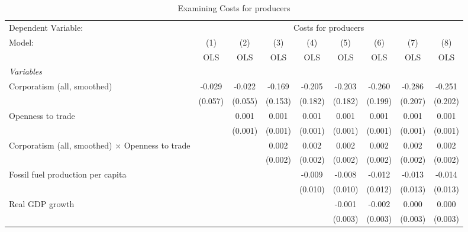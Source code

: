 
\begin{table}[htbp]
   \caption{Examining Costs for producers}
   \centering
   \begin{tabular}{lcccccccc}
      \toprule
      Dependent Variable: & \multicolumn{8}{c}{Costs for producers}\\
      Model:                                                  & (1)     & (2)     & (3)     & (4)     & (5)     & (6)     & (7)     & (8)\\  
                                                              &  OLS    & OLS     & OLS     & OLS     & OLS     & OLS     & OLS     & OLS\\  
      \midrule
      \emph{Variables}\\
      Corporatism (all, smoothed)                             & -0.029  & -0.022  & -0.169  & -0.205  & -0.203  & -0.260  & -0.286  & -0.251\\   
                                                              & (0.057) & (0.055) & (0.153) & (0.182) & (0.182) & (0.199) & (0.207) & (0.202)\\   
      Openness to trade                                       &         & 0.001   & 0.001   & 0.001   & 0.001   & 0.001   & 0.001   & 0.001\\   
                                                              &         & (0.001) & (0.001) & (0.001) & (0.001) & (0.001) & (0.001) & (0.001)\\   
      Corporatism (all, smoothed) $\times$ Openness to trade  &         &         & 0.002   & 0.002   & 0.002   & 0.002   & 0.002   & 0.002\\   
                                                              &         &         & (0.002) & (0.002) & (0.002) & (0.002) & (0.002) & (0.002)\\   
      Fossil fuel production per capita                       &         &         &         & -0.009  & -0.008  & -0.012  & -0.013  & -0.014\\   
                                                              &         &         &         & (0.010) & (0.010) & (0.012) & (0.013) & (0.013)\\   
      Real GDP growth                                         &         &         &         &         & -0.001  & -0.002  & 0.000   & 0.000\\   
                                                              &         &         &         &         & (0.003) & (0.003) & (0.003) & (0.003)\\   

\end{tabular}
\end{table}
